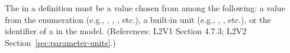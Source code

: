 The  in a \Parameter definition must be a value chosen from
among the following: a value from the  enumeration (e.g.,
, , , etc.), a built-in unit (e.g.,
, , etc.), or the identifier of a
\UnitDefinition in the model.  (References: L2V1 Section 4.7.3; L2V2
Section~\ref{sec:parameter-units}.)

